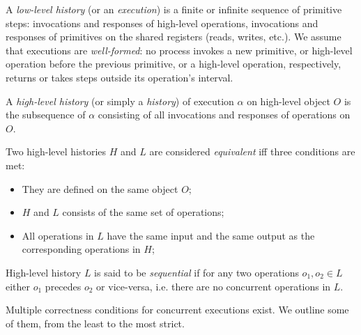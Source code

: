 \documentclass[times, dvipsnames,%
               languages={russian,english} %
              ]{itmo-student-thesis}
\begin{document}
\bigbreak

\begin{definition}
A \emph{low-level history} (or an \emph{execution}) is a finite or infinite sequence of primitive steps: invocations and responses of high-level operations, invocations and responses of primitives on the shared registers (reads, writes, etc.). We assume that executions are \emph{well-formed}: no process invokes a new primitive, or high-level operation before the previous primitive, or a high-level operation, respectively, returns or takes steps outside its operation’s interval.
\end{definition}

\begin{definition}
A \emph{high-level history} (or simply a \emph{history}) of execution $\alpha$ on high-level object $O$ is the
subsequence of $\alpha$ consisting of all invocations and responses of operations on $O$.
\end{definition}

\begin{definition}
Two high-level histories $H$ and $L$ are considered \emph{equivalent} iff three conditions are met:
\begin{itemize}
    \item They are defined on the same object $O$;
    \item $H$ and $L$ consists of the same set of operations;
    \item All operations in $L$ have the same input and the same output as the corresponding operations in $H$;
\end{itemize}
\end{definition}

\bigbreak
\begin{definition}
High-level history $L$ is said to be \emph{sequential} if for any two operations $o_1, o_2 \in L$ either $o_1$ precedes $o_2$ or vice-versa, i.e. there are no concurrent operations in $L$.
\end{definition}

\bigbreak
Multiple correctness conditions for concurrent executions exist. We outline some of them, from the least to the most strict.
\end{document}
